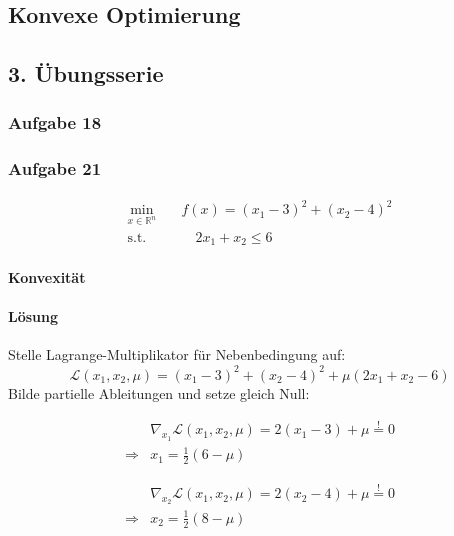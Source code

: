 \documentclass{article}
\begin{document}
\begin{center}
    \section*{Konvexe Optimierung}
    \subsection*{3. Übungsserie}
\end{center}

\subsubsection*{Aufgabe 18}
\subsubsection*{Aufgabe 21}

\begin{equation*}
    \begin{split}
     \min\limits_{x \in \mathbb{R}^n} &\quad f(x) = (x_1 - 3)^2 + (x_2 -4)^2\\
    \text{s.t.} &\quad \quad 2x_1 + x_2 \leq 6  
\end{split}
\end{equation*}

\paragraph{Konvexität}
\paragraph{Lösung}
Stelle Lagrange-Multiplikator für Nebenbedingung auf:
\begin{equation*}
    \mathcal{L}(x_1,x_2,\mu) = (x_1 - 3)^2 + (x_2 -4)^2 + \mu(2x_1 + x_2 - 6 )
\end{equation*}
Bilde partielle Ableitungen und setze gleich Null:

\begin{equation}\label{dx1}
\begin{aligned}
            &\nabla_{x_1}\mathcal{L}(x_1,x_2,\mu) = 2(x_1-3)+\mu \overset{!}{=} 0 \\
        \Rightarrow& x_1 = \frac{1}{2}(6-\mu)
\end{aligned}
\end{equation}

\begin{equation}\label{dx2}
\begin{aligned}
    &\nabla_{x_2}\mathcal{L}(x_1,x_2,\mu) = 2(x_2-4)+\mu \overset{!}{=} 0 \\
    \Rightarrow& x_2 = \frac{1}{2}(8-\mu)
\end{aligned}
\end{equation}
\end{document}
